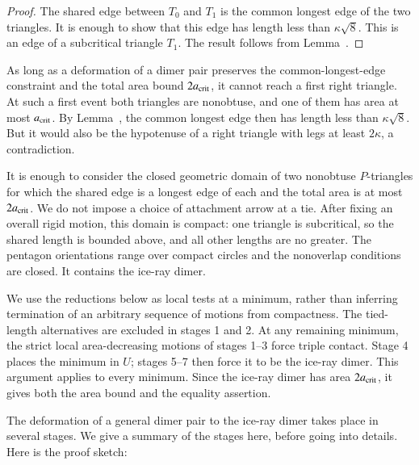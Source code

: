 \begin{proof}  
  The shared edge between $T_0$ and $T_1$ is the common longest edge
  of the two triangles.  It is enough to show that this edge has
  length less than $\kappa\sqrt8$.  This is an edge of a subcritical
  triangle $T_1$. The result follows from Lemma~.
\end{proof}

As long as a deformation of a dimer pair preserves the common-longest-edge
constraint and the total area bound $2a_\text{crit}$, it cannot reach a
first right triangle.  At such a first event both triangles are
nonobtuse, and one of them has area at most $a_\text{crit}$.  By
Lemma~, the common longest edge then has length
less than $\kappa\sqrt8$.  But it would also be the hypotenuse of
a right triangle with legs at least $2\kappa$, a contradiction.

It is enough to consider the closed geometric domain of two
nonobtuse $P$-triangles for which the shared edge is a longest
edge of each and the total area is at most $2a_\text{crit}$.
We do not impose a choice of attachment arrow at a tie.
After fixing an overall rigid motion, this domain is compact:
one triangle is subcritical, so the shared length is bounded above,
and all other lengths are no greater. The pentagon orientations
range over compact circles and the nonoverlap conditions are
closed. It contains the ice-ray dimer.

We use the reductions below as local tests at a minimum, rather
than inferring termination of an arbitrary sequence of motions
from compactness. The tied-length alternatives are excluded in
stages 1 and 2. At any remaining minimum, the strict local
area-decreasing motions of stages 1--3 force triple contact.
Stage 4 places the minimum in $U$; stages 5--7 then force it to
be the ice-ray dimer. This argument applies to every minimum.
Since the ice-ray dimer has area $2a_\text{crit}$, it gives both the area
bound and the equality assertion.

The deformation of a general dimer pair to the ice-ray dimer takes
place in several stages.  We give a summary of the stages here, before
going into details.  Here is the proof sketch:

